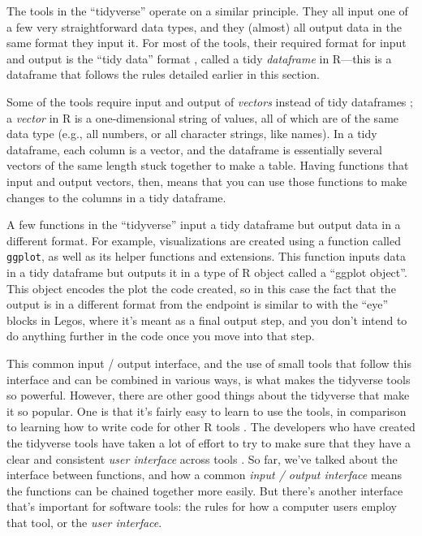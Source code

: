 \documentclass[]{tufte-book}
\begin{document}
The tools in the ``tidyverse'' operate on a similar principle. They all input one
of a few very straightforward data types, and they (almost) all output data in
the same format they input it. For most of the tools, their required format for
input and output is the ``tidy data'' format \citep{wickham2014tidy}, called a tidy
\emph{dataframe} in R---this is a dataframe that follows the rules detailed earlier
in this section.

Some of the tools require input and output of \emph{vectors} instead of tidy
dataframes \citep{wickham2014tidy}; a \emph{vector} in R is a one-dimensional string of values,
all of which are of the same data type (e.g., all numbers, or all character
strings, like names). In a tidy dataframe, each column is a vector, and the
dataframe is essentially several vectors of the same length stuck together to
make a table. Having functions that input and output vectors, then, means that
you can use those functions to make changes to the columns in a tidy dataframe.

A few functions in the ``tidyverse'' input a tidy dataframe but output data in a
different format. For example, visualizations are created using a function
called \texttt{ggplot}, as well as its helper functions and extensions. This function
inputs data in a tidy dataframe but outputs it in a type of R object called a
``ggplot object''. This object encodes the plot the code created, so in this case
the fact that the output is in a different format from the endpoint is similar
to with the ``eye'' blocks in Legos, where it's meant as a final output step, and
you don't intend to do anything further in the code once you move into that
step.

This common input / output interface, and the use of small tools that follow
this interface and can be combined in various ways, is what makes the tidyverse
tools so powerful. However, there are other good things about the tidyverse that
make it so popular. One is that it's fairly easy to learn to use the tools, in
comparison to learning how to write code for other R tools \citep{robinson2017teach, peng2018teaching}. The developers who have created the tidyverse tools have
taken a lot of effort to try to make sure that they have a clear and consistent
\emph{user interface} across tools \citep{wickham2017tidy, bryan2017data}. So far, we've
talked about the interface between functions, and how a common \emph{input / output
interface} means the functions can be chained together more easily. But there's
another interface that's important for software tools: the rules for how a
computer users employ that tool, or the \emph{user interface}.
\end{document}

